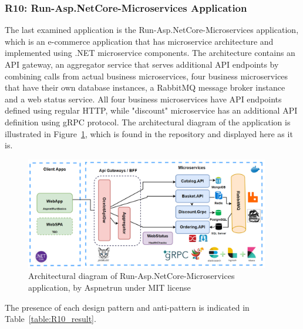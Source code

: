 \documentclass{Configuration_Files/PoliMi3i_thesis}
\begin{document}
\subsubsection{R10: Run-Asp.NetCore-Microservices Application}
\label{subsubsec:R10}

The last examined application is the Run-Asp.NetCore-Microservices application, which is an e-commerce application that has microservice architecture and implemented using .NET microservice components.
The architecture contains an API gateway, an aggregator service that serves additional API endpoints by combining calls from actual business microservices, four business microservices that have their own database instances, a RabbitMQ message broker instance and a web status service.
All four business microservices have API endpoints defined using regular HTTP, while "discount" microservice has an additional API definition using gRPC protocol.
The architectural diagram of the application is illustrated in Figure~\ref{fig:R10_arch}, which is found in the repository and displayed here as it is.

\begin{figure}[H]
\centering
\includegraphics[width=0.95\textwidth]{myImages/R10.png}
\caption{Architectural diagram of Run-Asp.NetCore-Microservices application, by Aspnetrun under MIT license}
\label{fig:R10_arch}
\end{figure}

The presence of each design pattern and anti-pattern is indicated in Table~\ref{table:R10_result}.
\end{document}
